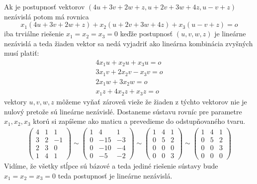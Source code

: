 \documentclass{article}
\begin{document}
Ak je postupnosť vektorov $(4u + 3v + 2w + z, u + 2v + 3w + 4z, u - v + z)$ nezávislá potom má rovnica 
\begin{equation*}
    x_1(4u + 3v + 2w + z)+x_2( u + 2v + 3w + 4z)+x_3( u - v + z) =o
\end{equation*}
iba trviálne riešenie $x_1=x_2=x_3=0$ keďže postupnosť $(u,v,w,z)$ je lineárne nezávislá a teda žiaden vektor sa nedá vyjadriť ako lineárna kombinácia zvyšných musí platiť:
\begin{align}
    4x_1u +x_2u+x_3u=o\nonumber\\
    3x_1v +2x_2v-x_3v=o\nonumber\\
    2x_1w +3x_2w=o\nonumber\\
    x_1z+4x_2z+x_3z =o\nonumber
\end{align}
vektory $u,v,w,z$ môžeme vyňať zároveň vieže že žiaden z týchto  vektorov nie je nulový pretože sú lineárne nezávislé. Dostaneme sústavu rovníc pre parametre $x_1,x_2,x_3$ ktorú si zapíšeme ako maticu a prevedieme do odstupňovaného tvaru.
\begin{align}\nonumber
    \begin{pmatrix}
        4 & 1 & 1\\
        3 & 2 & -1\\
        2& 3 & 0\\
        1& 4 & 1
    \end{pmatrix}
    \sim 
        \begin{pmatrix}
        1& 4 & 1\\
        0 & -15 & -3\\
        0 & -10 & -4\\
        0& -5& -2 
    \end{pmatrix}
    \sim
    \begin{pmatrix}
        1& 4 & 1\\
        0 & 5 & 2\\
        0 & 0 & 0\\
        0& 0& 3 
    \end{pmatrix}
    \sim
    \begin{pmatrix}
        1& 4 & 1\\
        0 & 5 & 2\\
      0& 0& 3 \\
        0 & 0 & 0
    \end{pmatrix}
\end{align}
Vidíme, že všetky stĺpce sú bázové a teda jediné riešenie sústavy bude $x_1=x_2=x_3=0$ teda postupnosť je lineárne nezávislá.
\end{document}
